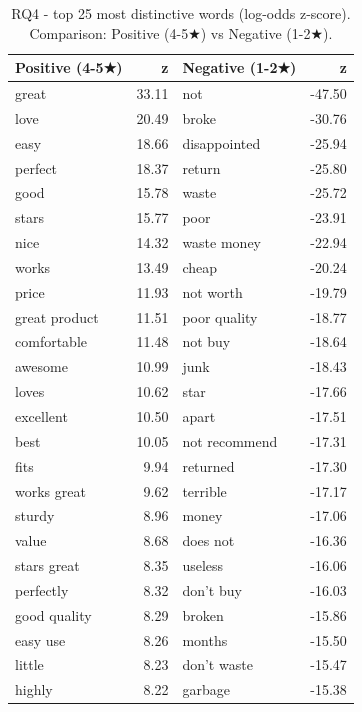 \begin{table}[h]
\centering
\caption{RQ4 - top 25 most distinctive words (log-odds z-score). Comparison: Positive (4-5★) vs Negative (1-2★).}
\label{tab:rq4_sports}
\begin{tabular}{lr|lr}
\toprule
\textbf{Positive (4-5★)} & z & \textbf{Negative (1-2★)} & z \\
\midrule
great & 33.11 & not & -47.50 \\
love & 20.49 & broke & -30.76 \\
easy & 18.66 & disappointed & -25.94 \\
perfect & 18.37 & return & -25.80 \\
good & 15.78 & waste & -25.72 \\
stars & 15.77 & poor & -23.91 \\
nice & 14.32 & waste money & -22.94 \\
works & 13.49 & cheap & -20.24 \\
price & 11.93 & not worth & -19.79 \\
great product & 11.51 & poor quality & -18.77 \\
comfortable & 11.48 & not buy & -18.64 \\
awesome & 10.99 & junk & -18.43 \\
loves & 10.62 & star & -17.66 \\
excellent & 10.50 & apart & -17.51 \\
best & 10.05 & not recommend & -17.31 \\
fits & 9.94 & returned & -17.30 \\
works great & 9.62 & terrible & -17.17 \\
sturdy & 8.96 & money & -17.06 \\
value & 8.68 & does not & -16.36 \\
stars great & 8.35 & useless & -16.06 \\
perfectly & 8.32 & don't buy & -16.03 \\
good quality & 8.29 & broken & -15.86 \\
easy use & 8.26 & months & -15.50 \\
little & 8.23 & don't waste & -15.47 \\
highly & 8.22 & garbage & -15.38 \\
\bottomrule
\end{tabular}
\end{table}